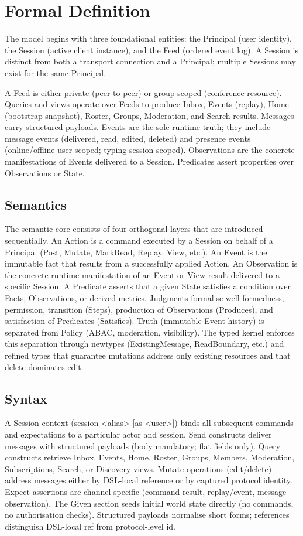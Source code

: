\documentclass{article}
\begin{document}
\section{Formal Definition}

The model begins with three foundational entities: the Principal (user identity),
the Session (active client instance), and the Feed (ordered event log). A Session is distinct from
both a transport connection and a Principal; multiple Sessions may exist for the same Principal.

A Feed is either private (peer-to-peer) or group-scoped (conference resource). Queries and views
operate over Feeds to produce Inbox, Events (replay), Home (bootstrap snapshot), Roster, Groups,
Moderation, and Search results. Messages carry structured payloads. Events are the sole runtime
truth; they include message events (delivered, read, edited, deleted) and presence events (online/offline
user-scoped; typing session-scoped). Observations are the concrete manifestations of Events delivered to
a Session. Predicates assert properties over Observations or State.

\subsection{Semantics}

The semantic core consists of four orthogonal layers that are introduced sequentially.
An Action is a command executed by a Session on behalf of a Principal (Post, Mutate, MarkRead, Replay, View, etc.).
An Event is the immutable fact that results from a successfully applied Action.
An Observation is the concrete runtime manifestation of an Event or View result delivered to a specific Session.
A Predicate asserts that a given State satisfies a condition over Facts, Observations, or derived metrics.
Judgments formalise well-formedness, permission, transition (Steps), production of Observations (Produces), and satisfaction of Predicates (Satisfies).
Truth (immutable Event history) is separated from Policy (ABAC, moderation, visibility).
The typed kernel enforces this separation through newtypes (ExistingMessage, ReadBoundary, etc.)
and refined types that guarantee mutations address only existing resources and that delete dominates edit.

\subsection{Syntax}

A Session context (session <alias> [as <user>]) binds all subsequent commands and expectations to a
particular actor and session. Send constructs deliver messages with structured payloads (body mandatory; flat fields only).
Query constructs retrieve Inbox, Events, Home, Roster, Groups, Members, Moderation, Subscriptions, Search, or Discovery views.
Mutate operations (edit/delete) address messages either by DSL-local reference or by captured protocol identity.
Expect assertions are channel-specific (command result, replay/event, message observation).
The Given section seeds initial world state directly (no commands, no authorisation checks).
Structured payloads normalise short forms; references distinguish DSL-local ref from protocol-level id.
\end{document}
